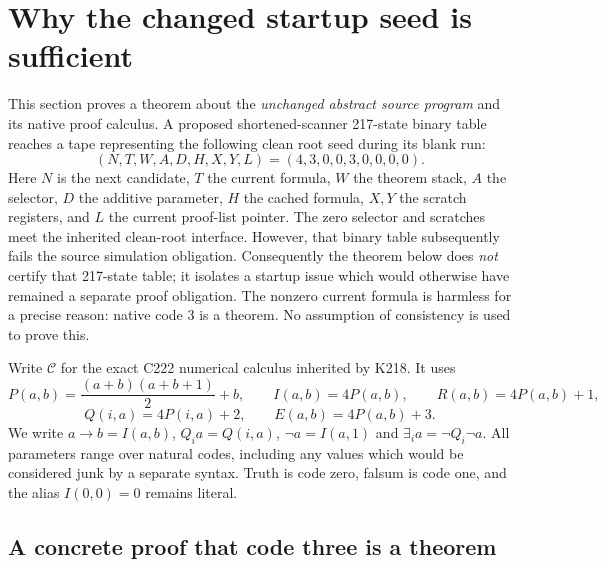 \section{Why the changed startup seed is sufficient}
\label{sec:seed217}

This section proves a theorem about the \emph{unchanged abstract source
program} and its native proof calculus. A proposed shortened-scanner
217-state binary table reaches a tape representing the following clean
root seed during its blank run:
\[
 (N,T,W,A,D,H,X,Y,L)=(4,3,0,0,3,0,0,0,0).
\]
Here $N$ is the next candidate, $T$ the current formula, $W$ the theorem
stack, $A$ the selector, $D$ the additive parameter, $H$ the cached formula,
$X,Y$ the scratch registers, and $L$ the current proof-list pointer.
The zero selector and scratches meet the inherited clean-root interface.
However, that binary table subsequently fails the source simulation
obligation. Consequently the theorem below does \emph{not} certify that
217-state table; it isolates a startup issue which would otherwise have
remained a separate proof obligation.
The nonzero current formula is harmless for a precise reason: native code
$3$ is a theorem. No assumption of consistency is used to prove this.

Write $\mathcal C$ for the exact C222 numerical calculus inherited by K218.
It uses
\[
 P(a,b)=\frac{(a+b)(a+b+1)}2+b,\qquad
 I(a,b)=4P(a,b),\qquad R(a,b)=4P(a,b)+1,
\]
\[
 Q(i,a)=4P(i,a)+2,\qquad E(a,b)=4P(a,b)+3.
\]
We write $a\to b=I(a,b)$, $Q_i a=Q(i,a)$,
$\neg a=I(a,1)$ and $\exists_i a=\neg Q_i\neg a$.
All parameters range over natural codes, including any values which would
be considered junk by a separate syntax. Truth is code zero, falsum is
code one, and the alias $I(0,0)=0$ remains literal.

\subsection{A concrete proof that code three is a theorem}

